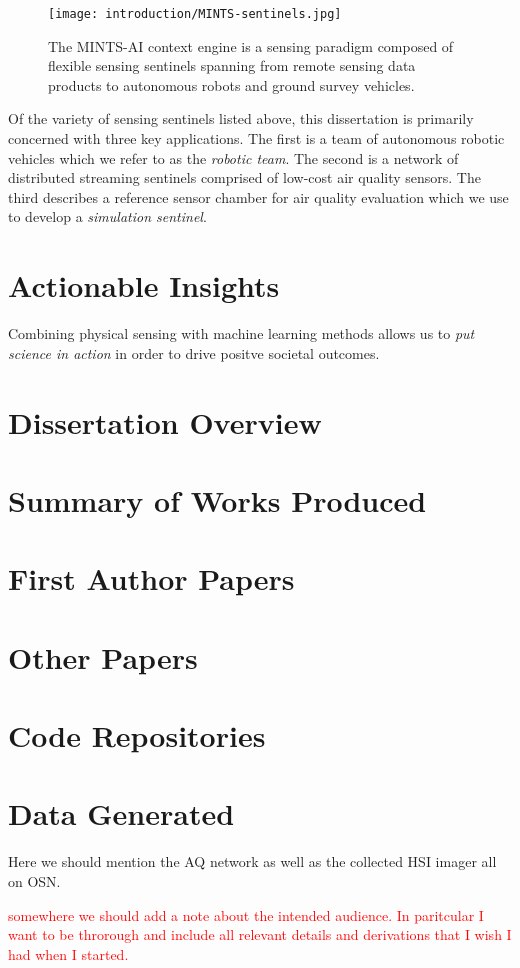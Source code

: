 \begin{figure}[!hbt]
  \centering
  \texttt{[image: introduction/MINTS-sentinels.jpg]}
  \caption{The MINTS-AI context engine is a sensing paradigm composed of flexible sensing sentinels spanning from remote sensing data products to autonomous robots and ground survey vehicles.}
  \label{fig:mints-ai}
\end{figure}

Of the variety of sensing sentinels listed above, this dissertation is primarily concerned with three key applications. The first is a team of autonomous robotic vehicles which we refer to as the \textit{robotic team}. The second is a network of distributed streaming sentinels comprised of low-cost air quality sensors. The third describes a reference sensor chamber for air quality evaluation which we use to develop a \textit{simulation sentinel}.


\section{Actionable Insights}

Combining physical sensing with machine learning methods allows us to \textit{put science in action} in order to drive positve societal outcomes.


\section{Dissertation Overview}

\section{Summary of Works Produced}

\section{First Author Papers}
\section{Other Papers}
\section{Code Repositories}
\section{Data Generated}
Here we should mention the AQ network as well as the collected HSI imager all on OSN.


\textcolor{red}{somewhere we should add a note about the intended audience. In paritcular I want to be throrough and include all relevant details and derivations that I wish I had when I started.}

